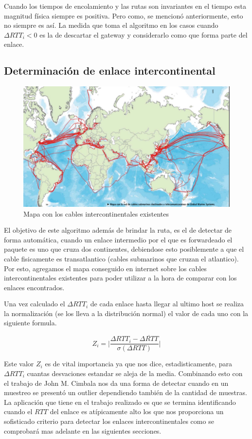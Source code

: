 Cuando los tiempos de encolamiento y las rutas son invariantes en el tiempo
esta magnitud física siempre es positiva. Pero como, se mencionó anteriormente, esto
no siempre es así. La medida que toma el algoritmo en los casos cuando
$\Delta RTT_{i} < 0$ es la de descartar el
gateway y considerarlo como que forma parte del enlace.

\subsection{Determinación de enlace intercontinental}

\begin{figure}[ht]
	\begin{center}
		\includegraphics[width=0.6\columnwidth]{imagenes/mapa-transcontinental.png}
		\caption{Mapa con los cables intercontinentales existentes}
	\end{center}
\end{figure}

El objetivo de este algoritmo además de brindar la ruta, es el de detectar de
forma automática, cuando un enlace intermedio por el que es forwardeado el
paquete es uno que cruza dos continentes, debiendose esto posiblemente a
que el cable fisicamente es transatlantico (cables submarinos que cruzan el
atlantico). Por esto, agregamos el mapa conseguido en internet sobre los cables
intercontinentales existentes para poder utilizar a la hora de comparar con
los enlaces encontrados.

Una vez calculado el $\Delta RTT_{i}$ de cada enlace hasta llegar
al ultimo host se realiza la normalización (se los lleva a la distribución normal)
el valor de cada uno con la siguiente formula.

\begin{equation}\label{eq:z}
	Z_{i} = \lvert\frac{\Delta RTT_{i} - \overline{\Delta RTT}}{\sigma \left(\Delta RTT \right)}\rvert
\end{equation}

Este valor $Z_{i}$ es de vital importancia ya que nos dice, estadisticamente,
para $\Delta RTT_{i}$ cuantas desvaciones estandar se aleja de la media.
Combinando esto con el trabajo de John M. Cimbala\cite{cimbala} nos da una forma de
detectar cuando en un muestreo se presentó un outlier dependiendo también de la
cantidad de muestras. La aplicación que tiene en el trabajo realizado es que se
termina identificando cuando el $RTT$ del enlace es atípicamente alto los que nos
proporciona un sofisticado criterio para detectar los enlaces
intercontinentales como se comprobará mas adelante en las siguientes secciones.
